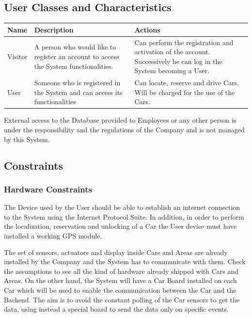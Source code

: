 \subsection{User Classes and Characteristics}
\begin{center}
  \begin{tabular}{|p{}|p{}|p{}|}
    \hline
    \textbf{Name} & \textbf{Description} & \textbf{Actions} \\ \hline
    Visitor & A person who would like to register an account to access the System functionalities. & Can perform the registration and activation of the account. Successively he can log in the System becoming a User.\\\hline
    User & Someone who is registered in the System and can access its functionalities & Can locate, reserve and drive Cars. Will be charged for the use of the Cars. \\ \hline
    \end{tabular}
\end{center}
\vspace{5mm}
External access to the Database provided to Employees or any other person is under the responsibility and the regulations of the Company and is not managed by this System.

\subsection{Constraints}
\subsubsection{Hardware Constraints}\label{OE}
The Device used by the User should be able to establish an internet connection to the System using the Internet Protocol Suite. In addition, in order to perform the localization, reservation and unlocking of a Car the User device must have installed a working GPS module. 

The set of sensors, actuators and display inside Cars and Areas are already installed by the Company and the System has to communicate with them. Check the assumptions to see all the kind of hardware already shipped with Cars and Areas. 
On the other hand, the System will have a Car Board installed on each Car which will be used to enable the communication between the Car and the Backend. The aim is to avoid the constant polling of the Car sensors to get the data, using instead a special board to send the data only on specific events.

